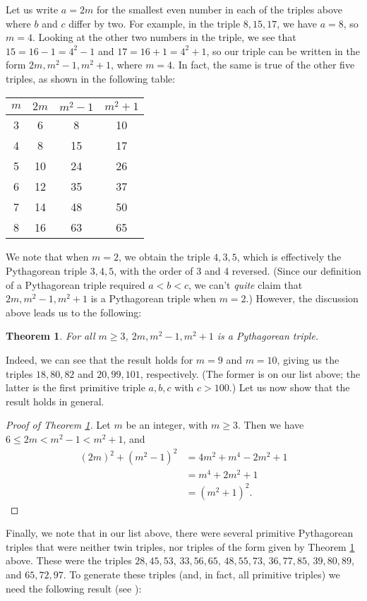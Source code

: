\documentclass[letterpaper,12pt]{article}
\newtheorem{theorem}{Theorem}
\theoremstyle{definition}
\begin{document}
Let us write $a=2m$ for the smallest even number in each of the triples above where $b$ and $c$ differ by two. For example, in the triple $8,15,17$, we have $a=8$, so $m=4$. Looking at the other two numbers in the triple, we see that $15 = 16-1 = 4^2-1$ and $17 = 16+1 = 4^2+1$, so our triple can be written in the form $2m,m^2-1,m^2+1$, where $m=4$. In fact, the same is true of the other five triples, as shown in the following table:
\begin{center}
 \begin{tabular}{|c|ccc|}
  \hline
 $m$ & $2m$ & $m^2-1$ & $m^2+1$\\
\hline
 3 & 6 & 8 & 10\\
 4 & 8 & 15 & 17\\
 5 & 10 & 24 & 26\\
 6 & 12 & 35 & 37\\
 7 & 14 & 48 & 50\\
 8 & 16 & 63 & 65\\
\hline
 \end{tabular}
\end{center}
We note that when $m=2$, we obtain the triple $4,3,5$, which is effectively the Pythagorean triple $3,4,5$, with the order of 3 and 4 reversed. (Since our definition of a Pythagorean triple required $a<b<c$, we can't \textit{quite} claim that $2m,m^2-1,m^2+1$ is a Pythagorean triple when $m=2$.) However, the discussion above leads us to the following:
\begin{theorem}\label{t1}
 For all $m\geq 3$, $2m,m^2-1,m^2+1$ is a Pythagorean triple.
\end{theorem}
Indeed, we can see that the result holds for $m=9$ and $m=10$, giving us the triples $18, 80, 82$ and $20,99,101$, respectively. (The former is on our list above; the latter is the first primitive triple $a,b,c$ with $c>100$.) Let us now show that the result holds in general.
\begin{proof}[Proof of Theorem \ref{t1}]
 Let $m$ be an integer, with $m\geq 3$. Then we have $6\leq 2m<m^2-1<m^2+1$, and
\begin{align*}
 (2m)^2+(m^2-1)^2 & = 4m^2 + m^4-2m^2+1\\
 & = m^4+2m^2+1\\
 & = (m^2+1)^2.
\end{align*}
\end{proof}
Finally, we note that in our list above, there were several primitive Pythagorean triples that were neither twin triples, nor triples of the form given by Theorem \ref{t1} above. These were the triples $28,45,53$, $33,56,65$, $48,55,73$, $36,77,85$, $39,80,89$, and $65,72,97$. To generate these triples (and, in fact, all primitive triples) we need the following result (see \cite{WP}):
\end{document}
